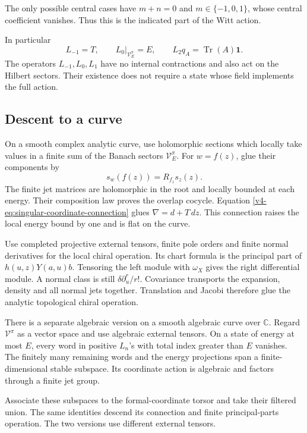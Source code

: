 The only possible central
cases have \(m+n=0\) and
\(m\in\{-1,0,1\}\), whose central coefficient
vanishes. Thus this is the indicated part
of the Witt action.

In particular
\[
 L_{-1}=T,
 \qquad L_0|_{\mathcal V_E^\pi}=E,
 \qquad L_2q_A=\operatorname{Tr}(A)\mathbf1.
\]
The operators \(L_{-1},L_0,L_1\) have no internal
contractions and also act on the Hilbert sectors.
Their existence does not require a state whose
field implements the full action.

\subsection{Descent to a curve}

On a smooth complex analytic curve, use holomorphic
sections which locally take values in a finite
sum of the Banach sectors \(\mathcal V_E^\pi\).
For \(w=f(z)\), glue their components by
\[
                        s_w(f(z))=R_{f_z}s_z(z).
\]
The finite jet matrices are holomorphic in
the root and locally bounded at each energy.
Their composition law proves the overlap
cocycle. Equation
\eqref{v4-eq:singular-coordinate-connection}
glues \(\nabla=d+T\,dz\). This connection
raises the local energy bound by one and
is flat on the curve.

Use completed projective external tensors,
finite pole orders and finite normal derivatives
for the local chiral operation. Its chart
formula is the principal part of \(h(u,z)Y(a,u)b\).
Tensoring the left module with \(\omega_X\)
gives the right differential module. A normal
class is still \(\delta\partial_u^r/r!\).
Covariance transports the expansion, density
and all normal jets together. Translation
and Jacobi therefore glue the analytic
topological chiral operation.

There is a separate algebraic version on a
smooth algebraic curve over \(\mathbb C\).
Regard \(\mathcal V^\pi\) as a vector space
and use algebraic external tensors. On a
state of energy at most \(E\), every word
in positive \(L_n\)'s with total index
greater than \(E\) vanishes. The finitely
many remaining words and the energy
projections span a finite-dimensional
stable subspace. Its coordinate action
is algebraic and factors through a finite
jet group.

Associate these subspaces to
the formal-coordinate torsor and take
their filtered union. The same identities
descend its connection and finite
principal-parts operation. The two
versions use different external tensors.

